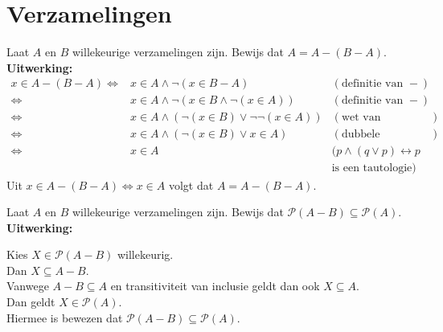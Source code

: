 \section{Verzamelingen}
\setcounter{answerT}{0}
\begin{answer}
Laat $A$ en $B$ willekeurige verzamelingen zijn. Bewijs dat $A=A-(B-A)$.\\[2.5pt]

\noindent\textbf{Uitwerking:}
$$\begin{array}{rll}
x\in A-(B-A) \Leftrightarrow& x\in A\land\neg (x\in B-A)&(\text{definitie van }-)\\
\Leftrightarrow&x\in A\land\neg(x\in B\land \neg(x\in A))&(\text{definitie van }-)\\
\Leftrightarrow&x\in A\land(\neg(x\in B)\lor\neg\neg(x\in A))&(\text{wet van DeMorgan})\\
\Leftrightarrow&x\in A\land(\neg(x\in B)\lor x\in A)&(\text{dubbele ontkenning})\\
\Leftrightarrow & x\in A&(p\land(q\lor p)\leftrightarrow p\\
&&\text{is een tautologie})
\end{array}$$
Uit $x\in A-(B-A)\Leftrightarrow x\in A$ volgt dat $A=A-(B-A)$.
\end{answer}

\begin{answer}
Laat $A$ en $B$ willekeurige verzamelingen zijn. Bewijs dat $\mathcal{P}(A-B)\subseteq\mathcal{P}(A)$.\\[2.5pt]

\noindent\textbf{Uitwerking:}\\
\indent\begin{minipage}{0.9\textwidth}
  Kies $X\in\mathcal{P}(A-B)$ willekeurig.\\[1.5pt]
  Dan $X\subseteq A-B$.\\[1.5pt]
  Vanwege $A-B\subseteq A$ en transitiviteit van inclusie geldt dan ook $X\subseteq A$.\\[1.5pt]
  Dan geldt $X\in\mathcal{P}(A)$.\\[1.5pt]
  Hiermee is bewezen dat $\mathcal{P}(A-B)\subseteq\mathcal{P}(A)$.
\end{minipage}
\end{answer}

